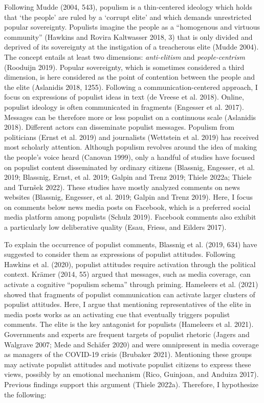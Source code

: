 \documentclass[
]{ccr}
\begin{document}
Following Mudde (2004, 543), populism is a thin-centered ideology which
holds that `the people' are ruled by a `corrupt elite' and which demands
unrestricted popular sovereignty. Populists imagine the people as a
``homogenous and virtuous community'' (Hawkins and Rovira Kaltwasser
2018, 3) that is only divided and deprived of its sovereignty at the
instigation of a treacherous elite (Mudde 2004). The concept entails at
least two dimensions: \emph{anti-elitism} and \emph{people-centrism}
(Rooduijn 2019). Popular sovereignty, which is sometimes considered a
third dimension, is here considered as the point of contention between
the people and the elite (Aslanidis 2018, 1255). Following a
communication-centered approach, I focus on expressions of populist
ideas in text (de Vreese et al. 2018). Online, populist ideology is
often communicated in fragments (Engesser et al. 2017). Messages can be
therefore more or less populist on a continuous scale (Aslanidis 2018).
Different actors can disseminate populist messages. Populism from
politicians (Ernst et al. 2019) and journalists (Wettstein et al. 2019)
has received most scholarly attention. Although populism revolves around
the idea of making the people's voice heard (Canovan 1999), only a
handful of studies have focused on populist content disseminated by
ordinary citizens (Blassnig, Engesser, et al. 2019; Blassnig, Ernst, et
al. 2019; Galpin and Trenz 2019; Thiele 2022a; Thiele and Turnšek 2022).
These studies have mostly analyzed comments on news websites (Blassnig,
Engesser, et al. 2019; Galpin and Trenz 2019). Here, I focus on comments
below news media posts on Facebook, which is a preferred social media
platform among populists (Schulz 2019). Facebook comments also exhibit a
particularly low deliberative quality (Esau, Friess, and Eilders 2017).

To explain the occurrence of populist comments, Blassnig et al. (2019,
634) have suggested to consider them as expressions of populist
attitudes. Following Hawkins et al. (2020), populist attitudes require
activation through the political context. Krämer (2014, 55) argued that
messages, such as media coverage, can activate a cognitive ``populism
schema'' through priming. Hameleers et al. (2021) showed that fragments
of populist communication can activate larger clusters of populist
attitudes. Here, I argue that mentioning representatives of the elite in
media posts works as an activating cue that eventually triggers populist
comments. The elite is the key antagonist for populists (Hameleers et
al. 2021). Governments and experts are frequent targets of populist
rhetoric (Jagers and Walgrave 2007; Mede and Schäfer 2020) and were
omnipresent in media coverage as managers of the COVID-19 crisis
(Brubaker 2021). Mentioning these groups may activate populist attitudes
and motivate populist citizens to express these views, possibly by an
emotional mechanism (Rico, Guinjoan, and Anduiza 2017). Previous
findings support this argument (Thiele 2022a). Therefore, I hypothesize
the following:
\end{document}
